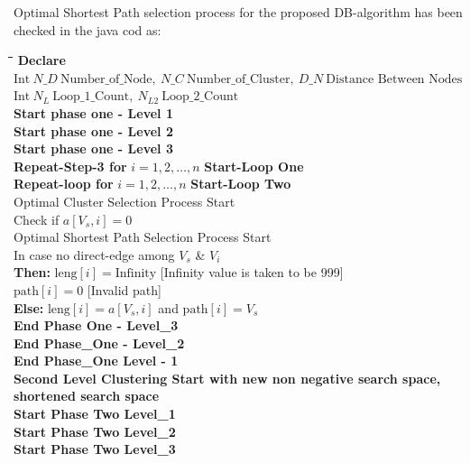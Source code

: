 \documentclass[10pt]{NSP1}
\begin{document}
	Optimal Shortest Path selection process for the proposed DB-algorithm has been checked in the java cod as:
	\begin{center}
	\begin{minipage}{0.52\columnwidth}
	\small
	\begin{tabbing}
		\quad \= \quad \= \quad \= \quad \= \quad \= \kill
		\textbf{Declare} $\text{Int}\ N\_D\ \text{Number\_of\_Node},\ N\_C\ \text{Number\_of\_Cluster},\ D\_N\ \text{Distance Between Nodes}$ \\
		$\text{Int}\ {N_L}\ \text{Loop\_1\_Count},\ {N_{L2}} \ \text{Loop\_2\_Count}$ \\[5pt]
		\textbf{Start phase one - Level 1} \\
		\> \textbf{Start phase one - Level 2} \\
		\> \> \textbf{Start phase one - Level 3} \\
		\> \> \> \textbf{Repeat-Step-3 for} $i = 1, 2, \dots, n$ \textbf{Start-Loop One} \\
		\> \> \> \> \textbf{Repeat-loop for} $i = 1, 2, \dots, n$ \textbf{Start-Loop Two} \\
		\> \> \> \> \> Optimal Cluster Selection Process Start \\
		\> \> \> \> \> Check if $a[V_s, i] = 0$ \\
		\> \> \> \> \> Optimal Shortest Path Selection Process Start \\
		\> \> \> \> \> In case no direct-edge among $V_s$ \& $V_i$ \\
		\> \> \> \> \> \textbf{Then:} $\text{leng}[i] = \text{Infinity}$ [Infinity value is taken to be 999] \\
		\> \> \> \> \>  $\text{path}[i] = 0$ [Invalid path] \\
		\> \> \> \> \> \textbf{Else:} $\text{leng}[i] = a[V_s, i]$ and $\text{path}[i] = V_s$ \\
		\> \> \textbf{End Phase One - Level\_3} \\
		\> \textbf{End Phase\_One - Level\_2} \\
		\textbf{End Phase\_One Level - 1} \\[8pt]
		\textbf{Second Level Clustering Start with new non negative search space, shortened search space} \\
		\textbf{Start Phase Two Level\_1} \\
		\> \textbf{Start Phase Two Level\_2} \\
		\> \> \textbf{Start Phase Two Level\_3} \\

\end{tabbing}
\end{minipage}
\end{center}
\end{document}
